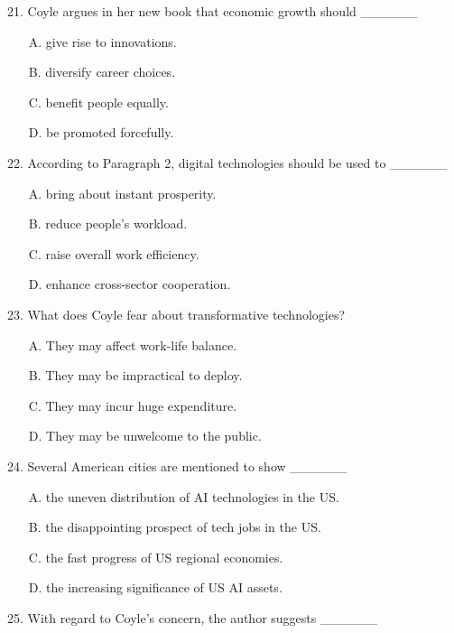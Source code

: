 \documentclass[UTF8,11pt]{ctexart}
\begin{document}
21. Coyle argues in her new book that economic growth should \_\_\_\_\_\_


\begin{itemize}[leftmargin=2em,itemsep=.2em,topsep=.4em]\item[A.] give rise to innovations.
\item[B.] diversify career choices.
\item[C.] benefit people equally.
\item[D.] be promoted forcefully.
\end{itemize}

22. According to Paragraph 2, digital technologies should be used to \_\_\_\_\_\_


\begin{itemize}[leftmargin=2em,itemsep=.2em,topsep=.4em]\item[A.] bring about instant prosperity.
\item[B.] reduce people’s workload.
\item[C.] raise overall work efficiency.
\item[D.] enhance cross-sector cooperation.
\end{itemize}

23. What does Coyle fear about transformative technologies?


\begin{itemize}[leftmargin=2em,itemsep=.2em,topsep=.4em]\item[A.] They may affect work-life balance.
\item[B.] They may be impractical to deploy.
\item[C.] They may incur huge expenditure.
\item[D.] They may be unwelcome to the public.
\end{itemize}

24. Several American cities are mentioned to show \_\_\_\_\_\_


\begin{itemize}[leftmargin=2em,itemsep=.2em,topsep=.4em]\item[A.] the uneven distribution of AI technologies in the US.
\item[B.] the disappointing prospect of tech jobs in the US.
\item[C.] the fast progress of US regional economies.
\item[D.] the increasing significance of US AI assets.
\end{itemize}

25. With regard to Coyle’s concern, the author suggests \_\_\_\_\_\_
\end{document}
